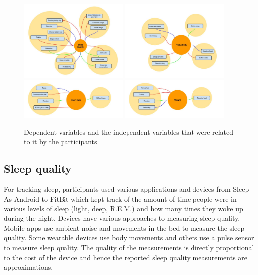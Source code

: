 \begin{figure}[!t]\centering
\includegraphics[width=0.47\textwidth]{images/Sleep_quality.jpg}
\includegraphics[width=0.47\textwidth]{images/Productivity.jpg}
\includegraphics[width=0.47\textwidth]{images/Heart_rate.jpg}
\includegraphics[width=0.47\textwidth]{images/Weight.jpg}
\caption{\footnotesize Dependent variables and the independent variables that were related to it by the participants \label{fig:dependentvsindependent} 
}%
\end{figure}

\subsection{Sleep quality}
For tracking sleep, participants used various applications and devices from Sleep As Android to FitBit which kept track of the amount of time people were in various levels of sleep (light, deep, R.E.M.) and how many times they woke up during the night. Devices have various approaches to measuring sleep quality. Mobile apps use ambient noise and movements in the bed to measure the sleep quality. Some wearable devices use body movements and others use a pulse sensor to measure sleep quality. The quality of the measurements is directly proportional to the cost of the device and hence the reported sleep quality measurements are approximations. 

